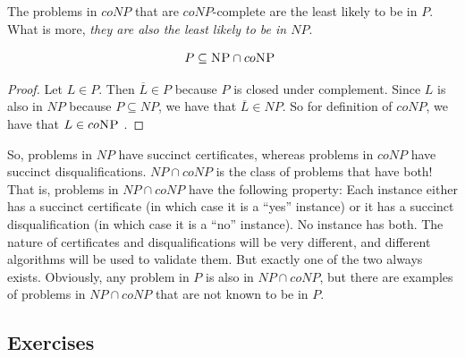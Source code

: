 \documentclass[12pt]{article}
\newcommand{\coNP}{co\textsc{NP }}
\begin{document}
The problems in $coNP$ that are $coNP$-complete are the least likely to be in $P$. What is more, \textit{they are also the least likely to be in $NP$}.
\begin{defbox}[Proposition]
  $$P\subseteq \textsc{NP}\cap\coNP$$
\end{defbox}
\begin{proof}
  Let $L\in P$. Then $\overline{L}\in P$ because $P$ is closed under complement. Since $L$ is also in $NP$ because $P\subseteq NP$, we have that $\overline{L}\in NP$. So for definition of $coNP$, we have that $L\in\coNP$.
\end{proof}
  So, problems in $NP$ have succinct certificates, whereas problems in $coNP$ have succinct disqualifications. $NP \cap coNP$ is the class of problems that have both! That is, problems in $NP \cap coNP$ have the following property: Each instance either has a succinct certificate (in which case it is a ``yes'' instance) or it has a succinct disqualification (in which case it is a ``no'' instance). No instance has both. The nature of certificates and disqualifications will be very different, and different algorithms will be used to validate them. But exactly one of the two always exists. Obviously, any problem in $P$ is also in $NP \cap coNP$, but there are examples of problems in $NP \cap coNP$ that are not known to be in $P$.
\subsection{Exercises}
\end{document}

